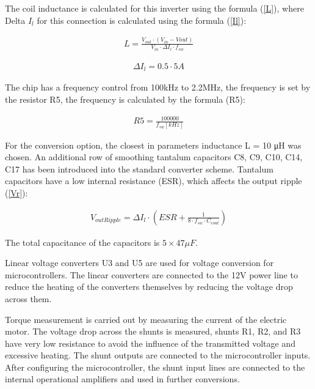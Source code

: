 The coil inductance is calculated for this inverter using the formula (\ref{L}), where Delta $I_{l}$ for this connection is calculated using the formula (\ref{Il}):
\begin{ceqn}
	\begin{align} \label{L}
		L = \frac{V_{out}\cdot(V_{in}-V{out})}{V_{in}\cdot\Delta  I_l\cdot f_{sw}}
	\end{align}
\end{ceqn}

\begin{ceqn}
	\begin{align} \label{Il}
		\Delta I_l = 0.5 \cdot 5A
	\end{align}
\end{ceqn}

The chip has a frequency control from 100kHz to 2.2MHz, the frequency is set by the resistor R5, the frequency is calculated by the formula (R5):
\begin{ceqn}
	\begin{align} \label{R5}
		R5 = \frac{100000}{f_{sw}[kHz]}
	\end{align}
\end{ceqn}

For the conversion option, the closest in parameters inductance L = 10 μH \citep{AP64502Q} was chosen. An additional row of smoothing tantalum capacitors C8, C9, C10, C14, C17 has been introduced into the standard converter scheme. Tantalum capacitors have a low internal resistance (ESR), which affects the output ripple (\ref{Vr}):

\begin{ceqn}
	\begin{align} \label{Vr}
		V_{outRipple} = \Delta I_l \cdot (ESR + \frac{1}{8\cdot f_{sw} \cdot C_{cout}})
	\end{align}
\end{ceqn}

The total capacitance of the capacitors is $5 \times 47\mu F$.

Linear voltage converters U3 and U5 are used for voltage conversion for microcontrollers. The linear converters are connected to the 12V power line to reduce the heating of the converters themselves by reducing the voltage drop across them.

Torque measurement is carried out by measuring the current of the electric motor. The voltage drop across the shunts is measured, shunts R1, R2, and R3 have very low resistance to avoid the influence of the transmitted voltage and excessive heating. The shunt outputs are connected to the microcontroller inputs. After configuring the microcontroller, the shunt input lines are connected to the internal operational amplifiers and used in further conversions.


